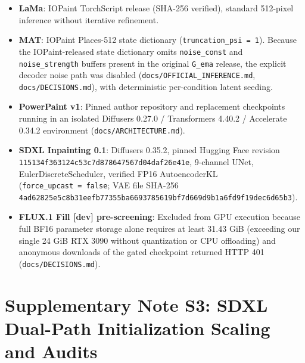 \documentclass[11pt,a4paper]{article}
\providecommand{\tightlist}{\setlength{\itemsep}{0pt}\setlength{\parskip}{0pt}}
\begin{document}
\begin{itemize}
\tightlist
\item
  \textbf{LaMa}: IOPaint TorchScript release (SHA-256 verified), standard 512-pixel inference without iterative refinement.
\item
  \textbf{MAT}: IOPaint Places-512 state dictionary (\texttt{truncation\_psi\ =\ 1}). Because the IOPaint-released state dictionary omits \texttt{noise\_const} and \texttt{noise\_strength} buffers present in the original \texttt{G\_ema} release, the explicit decoder noise path was disabled (\nolinkurl{docs/OFFICIAL_INFERENCE.md}, \nolinkurl{docs/DECISIONS.md}), with deterministic per-condition latent seeding.
\item
  \textbf{PowerPaint v1}: Pinned author repository and replacement checkpoints running in an isolated Diffusers 0.27.0 / Transformers 4.40.2 / Accelerate 0.34.2 environment (\nolinkurl{docs/ARCHITECTURE.md}).
\item
  \textbf{SDXL Inpainting 0.1}: Diffusers 0.35.2, pinned Hugging Face revision \nolinkurl{115134f363124c53c7d878647567d04daf26e41e}, 9-channel UNet, EulerDiscreteScheduler, verified FP16 AutoencoderKL (\texttt{force\_upcast\ =\ false}; VAE file SHA-256 \nolinkurl{4ad62825e5c8b31eefb77355ba6693785619bf7d669d9b1a6fd9f19dec6d65b3}).
\item
  \textbf{FLUX.1 Fill {[}dev{]} pre-screening}: Excluded from GPU execution because full BF16 parameter storage alone requires at least 31.43 GiB (exceeding our single 24 GiB RTX 3090 without quantization or CPU offloading) and anonymous downloads of the gated checkpoint returned HTTP 401 (\nolinkurl{docs/DECISIONS.md}).
\end{itemize}

\section{Supplementary Note S3: SDXL Dual-Path Initialization Scaling and Audits}\label{supplementary-note-s3-sdxl-dual-path-initialization-scaling-and-audits}
\end{document}
